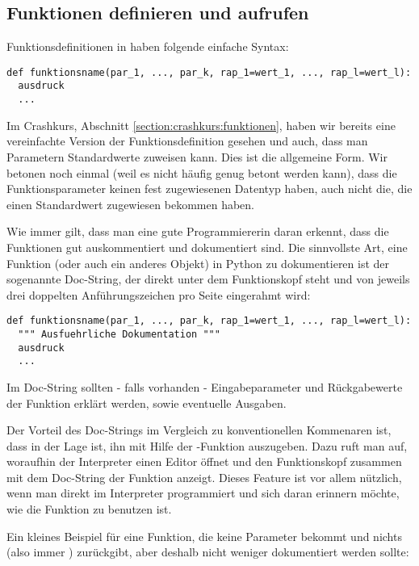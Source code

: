 \subsection{Funktionen definieren und aufrufen}
\label{section:funktionen:funktionen_definieren_und_aufrufen}

Funktionsdefinitionen in \Python haben folgende einfache Syntax:

\begin{lstlisting}
def funktionsname(par_1, ..., par_k, rap_1=wert_1, ..., rap_l=wert_l):
  ausdruck
  ...
\end{lstlisting}

Im Crashkurs, Abschnitt \ref{section:crashkurs:funktionen}, haben wir bereits eine vereinfachte Version der Funktionsdefinition gesehen und auch, dass man 
Parametern Standardwerte zuweisen kann. Dies ist die allgemeine Form. Wir betonen noch einmal (weil es nicht häufig genug betont 
werden kann), dass die Funktionsparameter keinen fest zugewiesenen Datentyp haben, auch nicht die, die einen Standardwert zugewiesen
bekommen haben.

Wie immer gilt, dass man eine gute Programmiererin daran erkennt, dass die Funktionen gut auskommentiert und dokumentiert sind.
Die sinnvollste Art, eine Funktion (oder auch ein anderes Objekt) in Python zu dokumentieren ist der sogenannte Doc-String, der 
direkt unter dem Funktionskopf steht und von jeweils drei doppelten Anführungszeichen pro Seite eingerahmt wird:

\begin{lstlisting}
def funktionsname(par_1, ..., par_k, rap_1=wert_1, ..., rap_l=wert_l):
  """ Ausfuehrliche Dokumentation """
  ausdruck
  ...
\end{lstlisting}

Im Doc-String sollten - falls vorhanden - Eingabeparameter und Rückgabewerte der Funktion erklärt werden, sowie eventuelle Ausgaben.

Der Vorteil des Doc-Strings im Vergleich zu konventionellen Kommenaren ist, dass \Python in der Lage ist, ihn mit Hilfe der 
-Funktion auszugeben. Dazu ruft man  auf, woraufhin der Interpreter einen Editor öffnet 
und den Funktionskopf zusammen mit dem Doc-String der Funktion anzeigt. Dieses Feature ist vor allem nützlich, wenn man direkt im 
Interpreter programmiert und sich daran erinnern möchte, wie die Funktion zu benutzen ist. 

Ein kleines Beispiel für eine Funktion, die keine Parameter bekommt und nichts (also immer ) zurückgibt, aber deshalb 
nicht weniger dokumentiert werden sollte:

